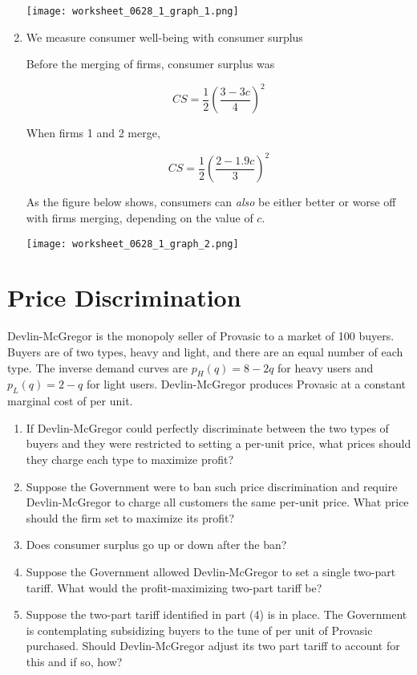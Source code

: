 \documentclass{article}
\newenvironment{solution}{\color{red}}{\color{black}}
\begin{document}
\begin{solution}
\begin{enumerate}
\texttt{[image: worksheet\_0628\_1\_graph\_1.png]}

\item We measure consumer well-being with consumer surplus

Before the merging of firms, consumer surplus was 

\[ CS=\frac{1}{2}(\frac{3-3c}{4})^2 \]

When firms 1 and 2 merge,

\[ CS=\frac{1}{2} (\frac{2-1.9c}{3})^2 \]

As the figure below shows, consumers can \emph{also} be either better or worse off with firms merging, depending on the value of $c$.

\texttt{[image: worksheet\_0628\_1\_graph\_2.png]}
\end{enumerate}

\end{solution} 

\section*{Price Discrimination}

Devlin-McGregor is the monopoly seller of Provasic to a market of 100 buyers. Buyers are of two types, heavy and light, and there are an equal number of each type. The inverse demand curves are $p_H(q) = 8 - 2q$ for heavy users and $p_L(q) = 2-q$ for light users. Devlin-McGregor produces Provasic at a constant marginal cost of  per unit.

\begin{enumerate}
\item If Devlin-McGregor could perfectly discriminate between the two types of buyers and they were restricted to setting a per-unit price, what prices should they charge each type to maximize profit?
\item Suppose the Government were to ban such price discrimination and require Devlin-McGregor to charge all customers the same per-unit price. What price should the firm set to maximize its profit?
\item Does consumer surplus go up or down after the ban?
\item  Suppose the Government allowed Devlin-McGregor to set a single two-part tariff. What would the profit-maximizing two-part tariff be?
\item Suppose the two-part tariff identified in part (4) is in place. The Government is contemplating subsidizing buyers to the tune of  per unit of Provasic purchased. Should Devlin-McGregor adjust its two part tariff to account for this and if so, how?
\end{enumerate}
\end{document}
